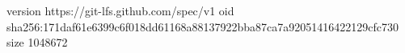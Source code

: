 version https://git-lfs.github.com/spec/v1
oid sha256:171daf61e6399c6f018dd61168a88137922bba87ca7a92051416422129cfc730
size 1048672
